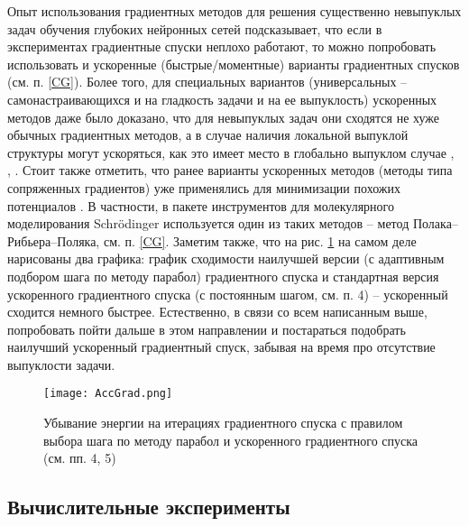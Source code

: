   Опыт использования градиентных методов для решения существенно невыпуклых задач обучения глубоких нейронных сетей \cite{Goodfellow2017} подсказывает, что если в экспериментах градиентные спуски неплохо работают, то можно попробовать использовать и ускоренные (быстрые/моментные) варианты градиентных спусков (см. п. \ref{CG}). Более того, для специальных вариантов (универсальных -- самонастраивающихся и на гладкость задачи и на ее выпуклость) ускоренных методов даже было доказано, что для невыпуклых задач они сходятся не хуже обычных градиентных методов, а в случае наличия локальной выпуклой структуры могут ускоряться, как это имеет место в глобально выпуклом случае \cite{ghadimi2015generalized}, \cite{guminov2019accelerated}, \cite{guminov2019universal}. Стоит также отметить, что ранее варианты ускоренных методов (методы типа сопряженных градиентов) уже применялись для минимизации похожих потенциалов \cite{wales1997global}. В частности, в пакете инструментов для молекулярного моделирования Schrödinger \cite{sastry2013protein} используется один из таких методов -- метод Полака--Рибьера--Поляка, см. п. \ref{CG}. Заметим также, что на рис. \ref{AG} на самом деле нарисованы два графика: график сходимости наилучшей версии (с адаптивным подбором шага по методу парабол) градиентного спуска и стандартная версия ускоренного градиентного спуска (с постоянным шагом, см. п. 4) -- ускоренный сходится немного быстрее. Естественно, в связи со всем написанным выше, попробовать пойти дальше в этом направлении и постараться подобрать наилучший ускоренный градиентный спуск, забывая на время про отсутствие выпуклости задачи. 

  \begin{figure}
  \begin{center}
  \texttt{[image: AccGrad.png]}
  \end{center}
  \caption{Убывание энергии на итерациях градиентного спуска с правилом выбора шага по методу парабол и ускоренного градиентного спуска (см. пп. 4, 5)}
   \label{AG}
  \end{figure}


\subsection{Вычислительные эксперименты } \label{subsec:sec1/su5}

